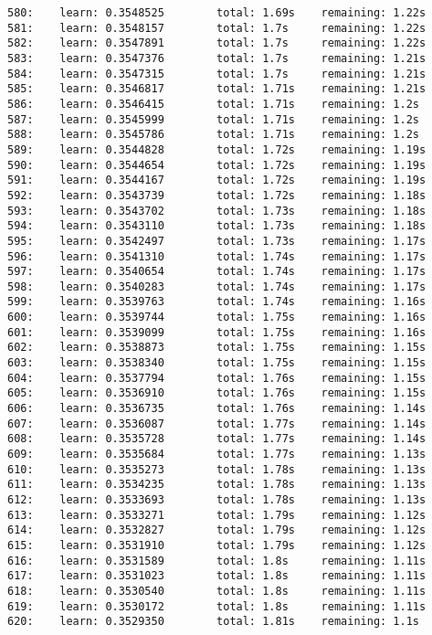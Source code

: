 \documentclass[11pt]{article}
\begin{document}
\begin{Verbatim}[commandchars=\\\{\}]
580:    learn: 0.3548525        total: 1.69s    remaining: 1.22s
581:    learn: 0.3548157        total: 1.7s     remaining: 1.22s
582:    learn: 0.3547891        total: 1.7s     remaining: 1.22s
583:    learn: 0.3547376        total: 1.7s     remaining: 1.21s
584:    learn: 0.3547315        total: 1.7s     remaining: 1.21s
585:    learn: 0.3546817        total: 1.71s    remaining: 1.21s
586:    learn: 0.3546415        total: 1.71s    remaining: 1.2s
587:    learn: 0.3545999        total: 1.71s    remaining: 1.2s
588:    learn: 0.3545786        total: 1.71s    remaining: 1.2s
589:    learn: 0.3544828        total: 1.72s    remaining: 1.19s
590:    learn: 0.3544654        total: 1.72s    remaining: 1.19s
591:    learn: 0.3544167        total: 1.72s    remaining: 1.19s
592:    learn: 0.3543739        total: 1.72s    remaining: 1.18s
593:    learn: 0.3543702        total: 1.73s    remaining: 1.18s
594:    learn: 0.3543110        total: 1.73s    remaining: 1.18s
595:    learn: 0.3542497        total: 1.73s    remaining: 1.17s
596:    learn: 0.3541310        total: 1.74s    remaining: 1.17s
597:    learn: 0.3540654        total: 1.74s    remaining: 1.17s
598:    learn: 0.3540283        total: 1.74s    remaining: 1.17s
599:    learn: 0.3539763        total: 1.74s    remaining: 1.16s
600:    learn: 0.3539744        total: 1.75s    remaining: 1.16s
601:    learn: 0.3539099        total: 1.75s    remaining: 1.16s
602:    learn: 0.3538873        total: 1.75s    remaining: 1.15s
603:    learn: 0.3538340        total: 1.75s    remaining: 1.15s
604:    learn: 0.3537794        total: 1.76s    remaining: 1.15s
605:    learn: 0.3536910        total: 1.76s    remaining: 1.15s
606:    learn: 0.3536735        total: 1.76s    remaining: 1.14s
607:    learn: 0.3536087        total: 1.77s    remaining: 1.14s
608:    learn: 0.3535728        total: 1.77s    remaining: 1.14s
609:    learn: 0.3535684        total: 1.77s    remaining: 1.13s
610:    learn: 0.3535273        total: 1.78s    remaining: 1.13s
611:    learn: 0.3534235        total: 1.78s    remaining: 1.13s
612:    learn: 0.3533693        total: 1.78s    remaining: 1.13s
613:    learn: 0.3533271        total: 1.79s    remaining: 1.12s
614:    learn: 0.3532827        total: 1.79s    remaining: 1.12s
615:    learn: 0.3531910        total: 1.79s    remaining: 1.12s
616:    learn: 0.3531589        total: 1.8s     remaining: 1.11s
617:    learn: 0.3531023        total: 1.8s     remaining: 1.11s
618:    learn: 0.3530540        total: 1.8s     remaining: 1.11s
619:    learn: 0.3530172        total: 1.8s     remaining: 1.11s
620:    learn: 0.3529350        total: 1.81s    remaining: 1.1s

\end{Verbatim}
\end{document}

